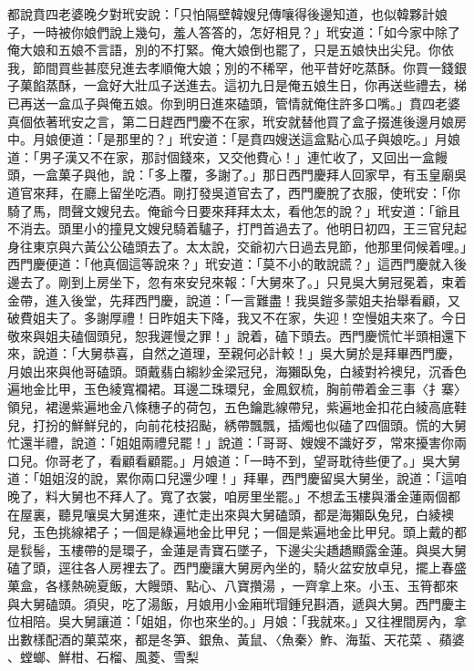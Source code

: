都說賁四老婆晚夕對玳安說：「只怕隔壁韓嫂兒傳嚷得後邊知道，也似韓夥計娘子，一時被你娘們說上幾句，羞人答答的，怎好相見？」玳安道：「如今家中除了俺大娘和五娘不言語，別的不打緊。俺大娘倒也罷了，只是五娘快出尖兒。你依我，節間買些甚麼兒進去孝順俺大娘；別的不稀罕，他平昔好吃蒸酥。你買一錢銀子菓餡蒸酥，一盒好大壯瓜子送進去。這初九日是俺五娘生日，你再送些禮去，梯已再送一盒瓜子與俺五娘。你到明日進來磕頭，管情就俺住許多口嘴。」賁四老婆真個依著玳安之言，第二日趕西門慶不在家，玳安就替他買了盒子掇進後邊月娘房中。月娘便道：「是那里的？」玳安道：「是賁四嫂送這盒點心瓜子與娘吃。」月娘道：「男子漢又不在家，那討個錢來，又交他費心！」連忙收了，又回出一盒饅頭，一盒菓子與他，說：「多上覆，多謝了。」那日西門慶拜人回家早，有玉皇廟吳道官來拜，在廳上留坐吃酒。剛打發吳道官去了，西門慶脫了衣服，使玳安：「你騎了馬，問聲文嫂兒去。俺爺今日要來拜拜太太，看他怎的說？」玳安道：「爺且不消去。頭里小的撞見文嫂兒騎着驢子，打門首過去了。他明日初四，王三官兒起身往東京與六黃公公磕頭去了。太太說，交爺初六日過去見節，他那里伺候着哩。」西門慶便道：「他真個這等說來？」玳安道：「莫不小的敢說謊？」這西門慶就入後邊去了。剛到上房坐下，忽有來安兒來報：「大舅來了。」只見吳大舅冠冕着，束着金帶，進入後堂，先拜西門慶，說道：「一言難盡！我吳鎧多蒙姐夫抬舉看顧，又破費姐夫了。多謝厚禮！日昨姐夫下降，我又不在家，失迎！空慢姐夫來了。今日敬來與姐夫磕個頭兒，恕我遲慢之罪！」說着，磕下頭去。西門慶慌忙半頭相還下來，說道：「大舅恭喜，自然之道理，至親何必計較！」吳大舅於是拜畢西門慶，月娘出來與他哥磕頭。頭戴翡白縐紗金梁冠兒，海獺臥兔，白綾對衿襖兒，沉香色遍地金比甲，玉色綾寬襴裙。耳邊二珠環兒，金鳳釵梳，胸前帶着金三事〈扌寨〉領兒，裙邊紫遍地金八條穗子的荷包，五色鑰匙線帶兒，紫遍地金扣花白綾高底鞋兒，打扮的鮮鮮兒的，向前花枝招颭，綉帶飄飄，插燭也似磕了四個頭。慌的大舅忙還半禮，說道：「姐姐兩禮兒罷！」說道：「哥哥、嫂嫂不識好歹，常來擾害你兩口兒。你哥老了，看顧看顧罷。」月娘道：「一時不到，望哥耽待些便了。」吳大舅道：「姐姐沒的說，累你兩口兒還少哩！」拜畢，西門慶留吳大舅坐，說道：「這咱晚了，料大舅也不拜人了。寬了衣裳，咱房里坐罷。」不想孟玉樓與潘金蓮兩個都在屋裏，聽見嚷吳大舅進來，連忙走出來與大舅磕頭，都是海獺臥兔兒，白綾襖兒，玉色挑線裙子；一個是綠遍地金比甲兒；一個是紫遍地金比甲兒。頭上戴的都是䯼髻，玉樓帶的是環子，金蓮是青寶石墜子，下邊尖尖趫趫顯露金蓮。與吳大舅磕了頭，逕往各人房裡去了。西門慶讓大舅房內坐的，騎火盆安放卓兒，擺上春盛菓盒，各樣熱碗夏飯，大饅頭、點心、八寶攢湯 ，一齊拿上來。小玉、玉筲都來與大舅磕頭。須臾，吃了湯飯，月娘用小金廂玳瑁鍾兒斟酒，遞與大舅。西門慶主位相陪。吳大舅讓道：「姐姐，你也來坐的。」月娘：「我就來。」又往裡間房內，拿出數樣配酒的菓菜來，都是冬笋、銀魚、黃鼠、〈魚秦〉鮓、海蜇、天花菜 、蘋婆 、螳螂、鮮柑、石榴、風菱、雪梨 